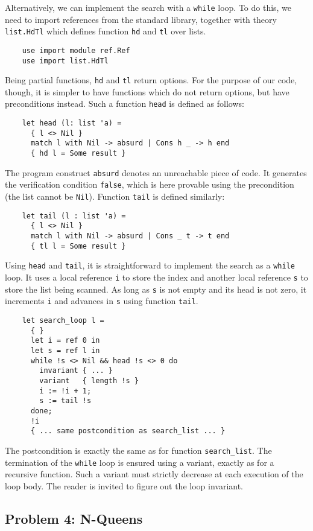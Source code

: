 Alternatively, we can implement the search with a \texttt{while} loop.
To do this, we need to import references from the standard library,
together with theory \texttt{list.HdTl} which defines function
\texttt{hd} and \texttt{tl} over lists.
\begin{verbatim}
    use import module ref.Ref
    use import list.HdTl
\end{verbatim}
Being partial functions, \texttt{hd} and \texttt{tl} return options.
For the purpose of our code, though, it is simpler to have functions
which do not return options, but have preconditions instead. Such a
function \texttt{head} is defined as follows:
\begin{verbatim}
    let head (l: list 'a) =
      { l <> Nil }
      match l with Nil -> absurd | Cons h _ -> h end
      { hd l = Some result }
\end{verbatim}
The program construct \texttt{absurd} denotes an unreachable piece of
code. It generates the verification condition \texttt{false}, which is
here provable using the precondition (the list cannot be \texttt{Nil}).
Function \texttt{tail} is defined similarly:
\begin{verbatim}
    let tail (l : list 'a) =
      { l <> Nil }
      match l with Nil -> absurd | Cons _ t -> t end
      { tl l = Some result }
\end{verbatim}
Using \texttt{head} and \texttt{tail}, it is straightforward to
implement the search as a \texttt{while} loop.
It uses a local reference \texttt{i} to store the index and another
local reference \texttt{s} to store the list being scanned.
As long as \texttt{s} is not empty and its head is not zero, it
increments \texttt{i} and advances in \texttt{s} using function \texttt{tail}.
\begin{verbatim}
    let search_loop l =
      { }
      let i = ref 0 in
      let s = ref l in
      while !s <> Nil && head !s <> 0 do
        invariant { ... }
        variant   { length !s }
        i := !i + 1;
        s := tail !s
      done;
      !i
      { ... same postcondition as search_list ... }
\end{verbatim}
The postcondition is exactly the same as for function \verb|search_list|.
The termination of the \texttt{while} loop is ensured using a variant,
exactly as for a recursive function. Such a variant must strictly decrease at
each execution of the loop body. The reader is invited to figure out
the loop invariant.

\subsection{Problem 4: N-Queens}

